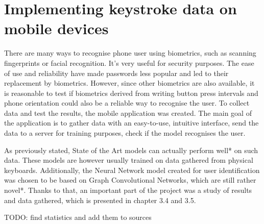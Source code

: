 
\chapter{Implementing keystroke data on mobile devices}

There are many ways to recognise phone user using biometrics, such as scanning fingerprints or facial recognition. It's very useful for security purposes. The ease of use and reliability have made passwords less popular and led to their replacement by biometrics. However, since other biometrics are also available, it is reasonable to test if biometrics derived from writing button press intervals and phone orientation could also be a reliable way to recognise the user. To collect data and test the results, the mobile application was created.
The main goal of the application is to gather data with an easy-to-use, intuitive interface, send the data to a server for training purposes, check if the model recognises the user. 

As previously stated, State of the Art models can actually perform well* on such data. These models are however usually trained on data gathered from physical keyboards. Additionally, the Neural Network model created for user identification was chosen to be based on Graph Convolutional Networks, which are still rather novel*.
Thanks to that, an important part of the project was a study of results and data gathered, which is presented in chapter 3.4 and 3.5.

TODO: find statistics and add them to sources